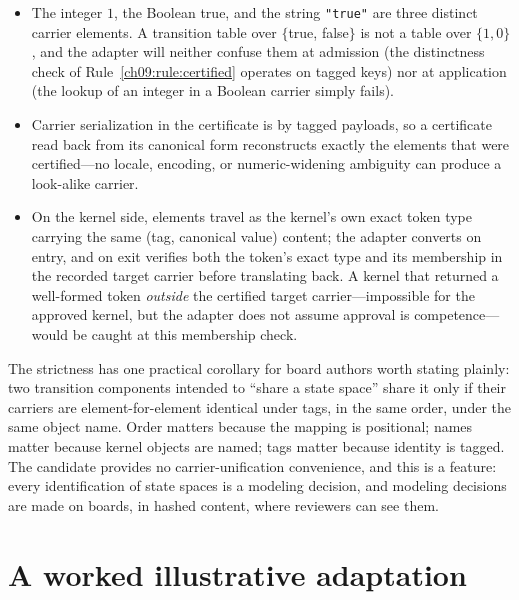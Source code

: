 \begin{itemize}
\item The integer $1$, the Boolean true, and the string \texttt{"true"} are three distinct carrier elements. A transition table over $\{$true, false$\}$ is not a table over $\{1, 0\}$, and the adapter will neither confuse them at admission (the distinctness check of Rule~\ref{ch09:rule:certified} operates on tagged keys) nor at application (the lookup of an integer in a Boolean carrier simply fails).
\item Carrier serialization in the certificate is by tagged payloads, so a certificate read back from its canonical form reconstructs exactly the elements that were certified---no locale, encoding, or numeric-widening ambiguity can produce a look-alike carrier.
\item On the kernel side, elements travel as the kernel's own exact token type carrying the same (tag, canonical value) content; the adapter converts on entry, and on exit verifies both the token's exact type and its membership in the recorded target carrier before translating back. A kernel that returned a well-formed token \emph{outside} the certified target carrier---impossible for the approved kernel, but the adapter does not assume approval is competence---would be caught at this membership check.
\end{itemize}

The strictness has one practical corollary for board authors worth stating plainly: two transition components intended to ``share a state space'' share it only if their carriers are element-for-element identical under tags, in the same order, under the same object name. Order matters because the mapping is positional; names matter because kernel objects are named; tags matter because identity is tagged. The candidate provides no carrier-unification convenience, and this is a feature: every identification of state spaces is a modeling decision, and modeling decisions are made on boards, in hashed content, where reviewers can see them.

\section{A worked illustrative adaptation}\label{ch09:sec:worked}

